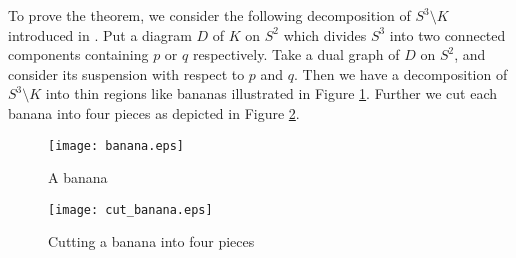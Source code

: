 \documentclass[12pt]{amsart}
\theoremstyle{definition}
\begin{document}
\noindent
To prove the theorem, we consider the following decomposition of $S^{3} \setminus K$ introduced in \cite{Hatakenaka1}.
Put a diagram $D$ of $K$ on $S^{2}$ which divides $S^{3}$ into two connected components containing $p$ or $q$ respectively.
Take a dual graph of $D$ on $S^{2}$, and consider its suspension with respect to $p$ and $q$.
Then we have a decomposition of $S^{3} \setminus K$ into thin regions like bananas illustrated in Figure \ref{fig:banana}.
Further we cut each banana into four pieces as depicted in Figure \ref{fig:cut_banana}.

\begin{figure}[htb]
\begin{center}
\texttt{[image: banana.eps]}
\end{center}
\caption{A banana}
\label{fig:banana}
\end{figure}

\begin{figure}[htb]
\begin{center}
\texttt{[image: cut\_banana.eps]}
\end{center}
\caption{Cutting a banana into four pieces}
\label{fig:cut_banana}
\end{figure}
\end{document}
